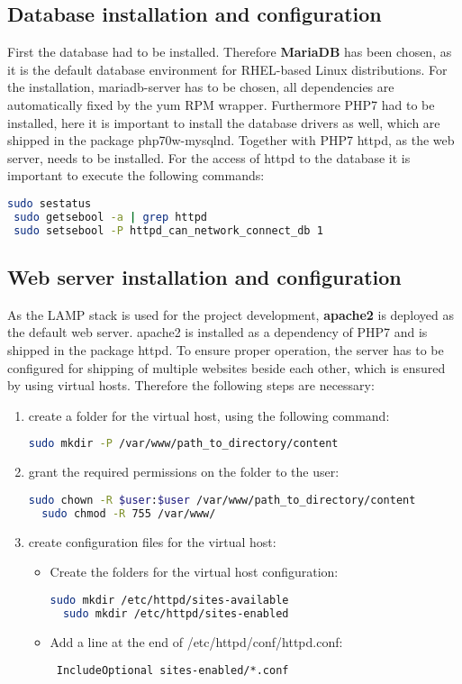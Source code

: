 \subsection{Database installation and configuration}
First the database had to be installed. 
Therefore \textbf{MariaDB} has been chosen, as it is the default database environment for RHEL-based Linux distributions. For the installation, mariadb-server has to be chosen, 
all dependencies are automatically fixed by the yum RPM wrapper. Furthermore PHP7 had to be installed, here it is important
to install the database drivers as well, which are shipped in the package php70w-mysqlnd. Together with PHP7 httpd, as the web server, needs to be installed. For the access of 
httpd to the database it is important to execute the following commands:\\
\begin{lstlisting}[language=bash]
 sudo sestatus
 sudo getsebool -a | grep httpd
 sudo setsebool -P httpd_can_network_connect_db 1
\end{lstlisting}

\subsection{Web server installation and configuration}
As the LAMP stack is used for the project development, \textbf{apache2} is deployed as the default web server. apache2 is installed as a dependency of PHP7 and is shipped in 
the package httpd. To ensure proper operation, the server has to be configured for shipping of multiple websites beside each other, which is ensured by using virtual hosts. 
Therefore the following steps are necessary: 
\begin{enumerate}
 \item create a folder for the virtual host, using the following command:
 \begin{lstlisting}[language=bash]
  sudo mkdir -P /var/www/path_to_directory/content
 \end{lstlisting}
 \item grant the required permissions on the folder to the user:
 \begin{lstlisting}[language=bash]
  sudo chown -R $user:$user /var/www/path_to_directory/content
  sudo chmod -R 755 /var/www/
 \end{lstlisting}
 \item create configuration files for the virtual host:
 \begin{itemize}
  \item Create the folders for the virtual host configuration:
 \begin{lstlisting}[language=bash]
  sudo mkdir /etc/httpd/sites-available
  sudo mkdir /etc/httpd/sites-enabled
 \end{lstlisting}
 \item Add a line at the end of /etc/httpd/conf/httpd.conf:
 \begin{lstlisting}
 IncludeOptional sites-enabled/*.conf
 \end{lstlisting}
 \end{itemize}
\end{enumerate}

